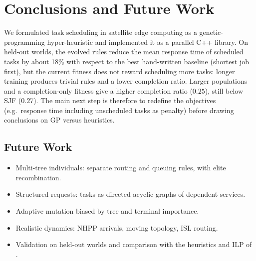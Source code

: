 \chapter{Conclusions and Future Work}
\label{ch:concl}

We formulated task scheduling in satellite edge computing as a genetic-programming
hyper-heuristic and implemented it as a parallel C++ library. On held-out worlds,
the evolved rules reduce the mean response time of scheduled tasks by about 18\%
with respect to the best hand-written baseline (shortest job first), but the
current fitness does not reward scheduling more tasks: longer training produces
trivial rules and a lower completion ratio. Larger populations and a
completion-only fitness give a higher completion ratio ($0.25$), still below
SJF ($0.27$). The main next step is therefore to redefine the objectives (e.g.\ response time
including unscheduled tasks as penalty) before drawing conclusions on GP versus heuristics.

\section{Future Work}
\label{sec:future}
\begin{itemize}
  \item Multi-tree individuals: separate routing and queuing rules, with elite recombination.
  \item Structured requests: tasks as directed acyclic graphs of dependent services.
  \item Adaptive mutation biased by tree and terminal importance.
  \item Realistic dynamics: NHPP arrivals, moving topology, ISL routing.
  \item Validation on held-out worlds and comparison with the heuristics and ILP of \citet{icdcs_sc}.
\end{itemize}
